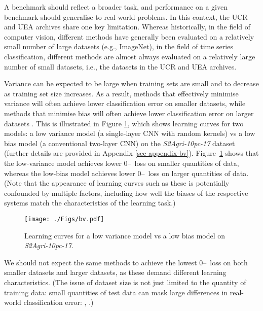 \documentclass[twoside,11pt,preprint]{article}
\newcommand{\zo}{\mbox{0--\!1}~loss}
\begin{document}
A benchmark should reflect a broader task, and performance on a given benchmark should generalise to real-world problems. In this context, the UCR and UEA archives share one key limitation. Whereas historically, in the field of computer vision, different methods have generally been evaluated on a relatively small number of large datasets (e.g., ImageNet), in the field of time series classification, different methods are almost always evaluated on a relatively large number of small datasets, i.e., the datasets in the UCR and UEA archives.

Variance can be expected to be large when training sets are small and to decrease as training set size increases. As a result, methods that effectively minimise variance will often achieve lower classification error on smaller datasets, while methods that minimise bias will often achieve lower classification error on larger datasets \citep{brain1999effect}. This is illustrated in Figure \ref{fig-bv}, which shows learning curves for two models: a low variance model (a single-layer CNN with random kernels) vs a low bias model (a conventional two-layer CNN) on the \textit{S2Agri-10pc-17} dataset (further details are provided in Appendix \ref{sec-appendix-bv}). Figure~\ref{fig-bv} shows that the low-variance model achieves lower {\zo} on smaller quantities of data, whereas the low-bias model achieves lower {\zo} on larger quantities of data. (Note that the appearance of learning curves such as these is potentially confounded by multiple factors, including how well the biases of the respective systems match the characteristics of the learning task.)

\begin{figure}%
    \centering%
    \texttt{[image: ./Figs/bv.pdf]}%
    \caption{Learning curves for a low variance model vs a low bias model on \textit{S2Agri-10pc-17}.}%
    \label{fig-bv}
\end{figure}%

We should not expect the same methods to achieve the lowest {\zo} on both smaller datasets and larger datasets, as these demand different learning characteristics. (The issue of dataset size is not just limited to the quantity of training data: small quantities of test data can mask large differences in real-world classification error: \citeauthor{liao_etal_2021}, \citeyear{liao_etal_2021}.)
\end{document}
